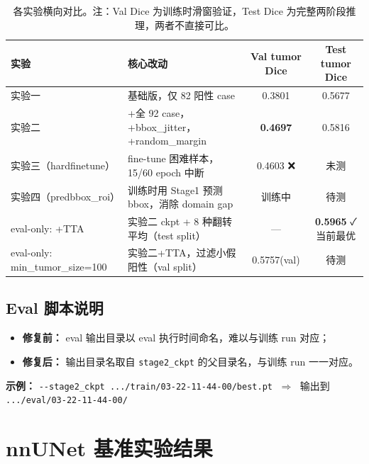 \documentclass{article}
\begin{document}
	\begin{table}[H]
		\centering
		\caption{各实验横向对比。注：Val Dice 为训练时滑窗验证，Test Dice 为完整两阶段推理，两者不直接可比。}
		\begin{tabular}{llcc}
			\hline
			\textbf{实验} & \textbf{核心改动} & \textbf{Val tumor Dice} & \textbf{Test tumor Dice} \\
			\hline
			实验一 & 基础版，仅 82 阳性 case                                   & 0.3801          & 0.5677 \\
			实验二 & +全 92 case，+bbox\_jitter，+random\_margin      & \textbf{0.4697} & 0.5816 \\
			实验三（hardfinetune） & fine-tune 困难样本，15/60 epoch 中断     & 0.4603 ❌       & 未测 \\
			实验四（predbbox\_roi）& 训练时用 Stage1 预测 bbox，消除 domain gap & 训练中          & 待测 \\
			\hline
			eval-only: +TTA        & 实验二 ckpt + 8 种翻转平均（test split）  & —               & \textbf{0.5965} ✓ 当前最优 \\
			eval-only: min\_tumor\_size=100 & 实验二+TTA，过滤小假阳性（val split）  & 0.5757(val)     & 待测 \\
			\hline
		\end{tabular}
	\end{table}
	
	\subsection{Eval 脚本说明}
	
	\begin{itemize}
		\item \textbf{修复前：} eval 输出目录以 eval 执行时间命名，难以与训练 run 对应；
		\item \textbf{修复后：} 输出目录名取自 \texttt{stage2\_ckpt} 的父目录名，与训练 run 一一对应。
	\end{itemize}
	
	\noindent\textbf{示例：} \verb|--stage2_ckpt .../train/03-22-11-44-00/best.pt|
	$\;\Rightarrow\;$ 输出到 \texttt{.../eval/03-22-11-44-00/}
	
	\section{nnUNet 基准实验结果}
	
\end{document}
